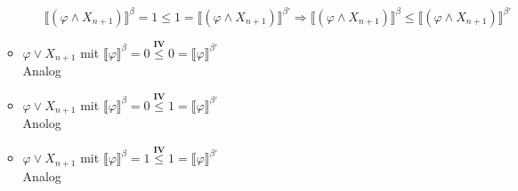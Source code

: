 \documentclass[a4paper,10pt]{article}
\begin{document}
\begin{itemize}
\begin{itemize}
\begin{itemize}
$\llbracket (\varphi \land X_{n+1}) \rrbracket^{\beta} = 1 \leq 1 = \llbracket (\varphi \land X_{n+1})  \rrbracket^{\beta'} \Rightarrow \llbracket (\varphi \land X_{n+1})  \rrbracket^{\beta} \leq \llbracket (\varphi \land X_{n+1})  \rrbracket^{\beta'} $
\end{itemize}
\item $\varphi \lor X_{n+1}$ mit $\llbracket \varphi \rrbracket^{\beta} = 0 \stackrel{\textbf{IV}}{\leq} 0 = \llbracket \varphi \rrbracket^{\beta'}$  \\
Analog
\item $\varphi \lor X_{n+1}$ mit $\llbracket \varphi \rrbracket^{\beta} = 0 \stackrel{\textbf{IV}}{\leq} 1 = \llbracket \varphi \rrbracket^{\beta'}$ \\
Anolog
\item $\varphi \lor X_{n+1}$ mit $\llbracket \varphi \rrbracket^{\beta} = 1 \stackrel{\textbf{IV}}{\leq} 1 = \llbracket \varphi \rrbracket^{\beta'}$  \\
Analog
\end{itemize}
\end{itemize}
\end{document}
